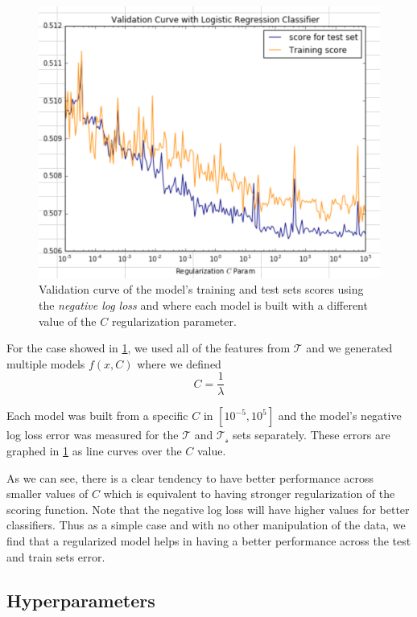 \begin{figure}[h!]
\begin{center}
\includegraphics[width=0.9\columnwidth]{figures/regularization/figure-log_loss_error_validation_curve.png}
\caption{ Validation curve of the model's training and test sets scores using the \textit{negative log loss} and where each model is built with a different value of the $C$ regularization parameter.}
\label{fig:log_loss_regularization_validation_curve}
\end{center}
\end{figure}

For the case  showed in \cref{fig:log_loss_regularization_validation_curve}, we used all of the features from $\mathcal{T}$ and we generated multiple models $f(x,C)$ where we defined
$$C = \frac{1}{\lambda} $$

Each model was built from a specific $C$ in  $[10^{-5},10^5]$  and the model's negative log loss error was measured for the $\mathcal{T}$ and $\mathcal{T_s}$ sets separately.
These errors are graphed in \cref{fig:log_loss_regularization_validation_curve} as line curves over the $C$ value.

As we can see, there is a clear tendency to have better performance across smaller values of $C$ which is equivalent to having stronger regularization of the scoring function.
Note that the negative log loss will have higher values for better classifiers.
Thus as a simple case and with no other manipulation of the data, we find that a regularized model helps in having a better performance across the test and train sets error.


\subsection{Hyperparameters}

